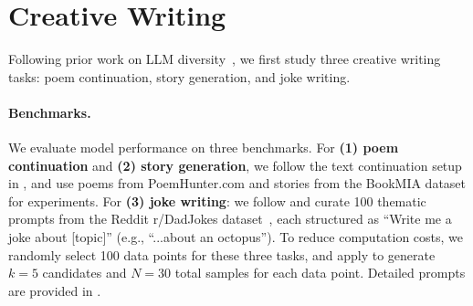 \section{Creative Writing}\label{sec:creative_writing}




Following prior work on LLM diversity~\citep{lu2025aihumanityssalieriquantifying}, we first study three creative writing tasks: poem continuation, story generation, and joke writing.


\paragraph{Benchmarks.} We evaluate model performance on three benchmarks. For \textbf{(1) poem continuation} and \textbf{(2) story generation}, we follow the text continuation  setup in \citet{lu2025aihumanityssalieriquantifying}, and use poems from PoemHunter.com and stories from the BookMIA dataset \citep{shi2024detectingpretrainingdatalarge} for experiments.
For \textbf{(3) joke writing}: we follow \citet{turgeman2025jokeruleallimpossibility} and curate 100 thematic prompts from the Reddit r/DadJokes dataset~\citep{reddit_dad_jokes_2023}, each structured as ``Write me a joke about [topic]'' (e.g., ``...about an octopus''). 
To reduce computation costs, we randomly select 100 data points for these three tasks, and apply \ourslower to generate $k=5$ candidates and $N=30$ total samples for each data point. Detailed prompts are provided in .


